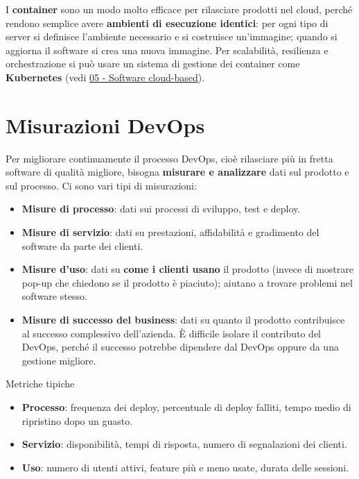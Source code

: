 I \textbf{container} sono un modo molto efficace per rilasciare prodotti
nel cloud, perché rendono semplice avere \textbf{ambienti di esecuzione
identici}: per ogni tipo di server si definisce l'ambiente necessario e
si costruisce un'immagine; quando si aggiorna il software si crea una
nuova immagine. Per scalabilità, resilienza e orchestrazione si può
usare un sistema di gestione dei container come \textbf{Kubernetes}
(vedi \href{05\%20-\%20Software\%20cloud-based}{05 - Software
cloud-based}).

\section{Misurazioni DevOps}\label{misurazioni-devops}

Per migliorare continuamente il processo DevOps, cioè rilasciare più in
fretta software di qualità migliore, bisogna \textbf{misurare e
analizzare} dati sul prodotto e sul processo. Ci sono vari tipi di
misurazioni:

\begin{itemize}
\tightlist
\item
  \textbf{Misure di processo}: dati sui processi di sviluppo, test e
  deploy.
\item
  \textbf{Misure di servizio}: dati su prestazioni, affidabilità e
  gradimento del software da parte dei clienti.
\item
  \textbf{Misure d'uso}: dati su \textbf{come i clienti usano} il
  prodotto (invece di mostrare pop-up che chiedono se il prodotto è
  piaciuto); aiutano a trovare problemi nel software stesso.
\item
  \textbf{Misure di successo del business}: dati su quanto il prodotto
  contribuisce al successo complessivo dell'azienda. È difficile isolare
  il contributo del DevOps, perché il successo potrebbe dipendere dal
  DevOps oppure da una gestione migliore.
\end{itemize}

\begin{boxexample}{Metriche tipiche}

\begin{itemize}
\tightlist
\item
  \textbf{Processo}: frequenza dei deploy, percentuale di deploy
  falliti, tempo medio di ripristino dopo un guasto.
\item
  \textbf{Servizio}: disponibilità, tempi di risposta, numero di
  segnalazioni dei clienti.
\item
  \textbf{Uso}: numero di utenti attivi, feature più e meno usate,
  durata delle sessioni.
\end{itemize}

\end{boxexample}

